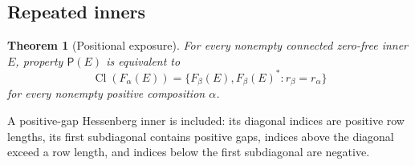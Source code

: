 \documentclass[11pt,a4paper]{amsart}
\numberwithin{equation}{section}
\theoremstyle{plain}
\newtheorem{theorem}{Theorem}[section]
\theoremstyle{definition}
\begin{document}
\subsection{Repeated inners}

\begin{theorem}[Positional exposure]\label{thm:exposure}
For every nonempty connected zero-free inner \(E\), property \(\mathsf P(E)\) is equivalent to
\begin{equation}\label{eq:exposure}
 \operatorname{Cl}(F_\alpha(E))
 =\{F_\beta(E),F_\beta(E)^*:r_\beta=r_\alpha\}
\end{equation}
for every nonempty positive composition \(\alpha\).
\end{theorem}
A positive-gap Hessenberg inner is included: its diagonal indices are positive row lengths, its first subdiagonal contains positive gaps, indices above the diagonal exceed a row length, and indices below the first subdiagonal are negative.
\end{document}

